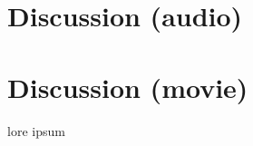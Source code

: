 \documentclass[english]{article}
\begin{document}
\section{Discussion (audio)}



\section{Discussion (movie)}
lore ipsum
\end{document}
